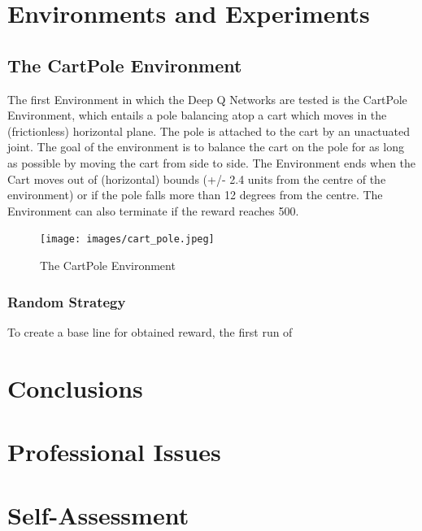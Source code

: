 \documentclass{article}
\begin{document}
\section{Environments and Experiments}

\subsection{The CartPole Environment}

The first Environment in which the Deep Q Networks are tested is the CartPole Environment, which entails a pole balancing atop a cart which moves in the (frictionless) horizontal plane. The pole is attached to the cart by an unactuated joint. The goal of the environment is to balance the cart on the pole for as long as possible by moving the cart from side to side. The Environment ends when the Cart moves out of (horizontal) bounds (+/- 2.4 units from the centre of the environment) or if the pole falls more than 12 degrees from the centre. The Environment can also terminate if the reward reaches 500.  

\begin{figure}[H]
    \centering
    \texttt{[image: images/cart\_pole.jpeg]}
    \caption{The CartPole Environment}
    \label{fig:cartpole}
\end{figure}

\subsubsection{Random Strategy}

To create a base line for obtained reward, the first run of


\section{Conclusions}

\section{Professional Issues}

\section{Self-Assessment}

\newpage
\printbibliography
\end{document}
